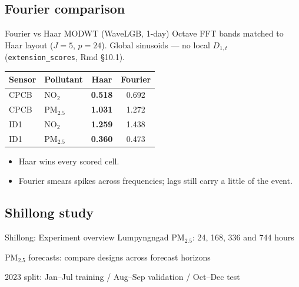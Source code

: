 \subsection{Fourier comparison}
\begin{frame}{Fourier vs Haar MODWT (WaveLGB, 1-day)}
  {\footnotesize
  Octave FFT bands matched to Haar layout ($J{=}5$, $p{=}24$).
  Global sinusoids --- no local $D_{1,t}$ (\texttt{extension\_scores}, Rmd §10.1).
  }
  \vspace{0.35em}
  {\scriptsize
  \centering
  \begin{tabular}{llcc}
    \toprule
    Sensor & Pollutant & Haar & Fourier \\
    \midrule
    CPCB & NO$_2$     & \textbf{0.518} & 0.692 \\
    CPCB & PM$_{2.5}$ & \textbf{1.031} & 1.272 \\
    ID1  & NO$_2$     & \textbf{1.259} & 1.438 \\
    ID1  & PM$_{2.5}$ & \textbf{0.360} & 0.473 \\
    \bottomrule
  \end{tabular}
  }
  \vspace{0.45em}
  \begin{itemize}
    \item Haar wins every scored cell.
    \item Fourier smears spikes across frequencies; lags still carry a little of the event.
  \end{itemize}
\end{frame}


\subsection{Shillong study}
\begin{frame}{Shillong: Experiment overview}
  \centering
  {\small Lumpyngngad PM$_{2.5}$: 24, 168, 336 and 744 hours}\par\medskip
  \par\medskip
  {\small PM$_{2.5}$ forecasts: compare designs across forecast horizons}\par
  {\scriptsize 2023 split: Jan--Jul training / Aug--Sep validation / Oct--Dec test}
\end{frame}

